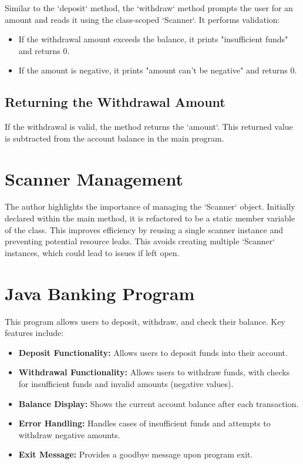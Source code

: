 \documentclass{article}
\begin{document}
Similar to the `deposit` method, the `withdraw` method prompts the user for an amount and reads it using the class-scoped `Scanner`.  It performs validation:

\begin{itemize}
    \item If the withdrawal amount exceeds the balance, it prints "insufficient funds" and returns 0.
    \item If the amount is negative, it prints "amount can't be negative" and returns 0.
\end{itemize}

\subsection{Returning the Withdrawal Amount}

If the withdrawal is valid, the method returns the `amount`. This returned value is subtracted from the account balance in the main program.


\section{Scanner Management}

The author highlights the importance of managing the `Scanner` object.  Initially declared within the main method, it is refactored to be a static member variable of the class. This improves efficiency by reusing a single scanner instance and preventing potential resource leaks.  This avoids creating multiple `Scanner` instances, which could lead to issues if left open.


\section{Java Banking Program}

This program allows users to deposit, withdraw, and check their balance.  Key features include:

\begin{itemize}
    \item \textbf{Deposit Functionality:} Allows users to deposit funds into their account.
    \item \textbf{Withdrawal Functionality:} Allows users to withdraw funds, with checks for insufficient funds and invalid amounts (negative values).
    \item \textbf{Balance Display:} Shows the current account balance after each transaction.
    \item \textbf{Error Handling:} Handles cases of insufficient funds and attempts to withdraw negative amounts.
    \item \textbf{Exit Message:} Provides a goodbye message upon program exit.
\end{itemize}
\end{document}
